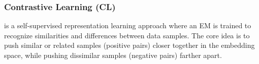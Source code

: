 \subsubsection{Contrastive Learning (CL)} is a self-supervised representation learning approach where an EM is trained to recognize similarities and differences between data samples. The core idea is to push similar or related samples (positive pairs) closer together in the embedding space, while pushing dissimilar samples (negative pairs) farther apart. 